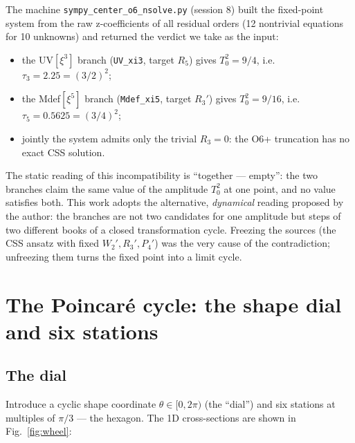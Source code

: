 \documentclass[11pt,a4paper]{article}
\newcommand{\tauu}{\tau_{3}}
\newcommand{\tauf}{\tau_{5}}
\begin{document}
The machine \texttt{sympy\_center\_o6\_nsolve.py} (session 8) built the
fixed-point system from the raw z-coefficients of all residual orders
(12 nontrivial equations for 10 unknowns) and returned the verdict we take
as the input:
\begin{itemize}
\item the UV$[\xi^3]$ branch (\texttt{UV\_xi3}, target $R_5$) gives
  $T_0^2 = 9/4$, i.e. $\tauu = 2.25 = (3/2)^2$;
\item the Mdef$[\xi^5]$ branch (\texttt{Mdef\_xi5}, target $R_3'$) gives
  $T_0^2 = 9/16$, i.e. $\tauf = 0.5625 = (3/4)^2$;
\item jointly the system admits only the trivial $R_3 = 0$: the O6+
  truncation has no exact CSS solution.
\end{itemize}
The static reading of this incompatibility is ``together --- empty'': the two
branches claim the same value of the amplitude $T_0^2$ at one point, and no
value satisfies both. This work adopts the alternative, \emph{dynamical}
reading proposed by the author: the branches are not two candidates for one
amplitude but steps of two different books of a closed transformation cycle.
Freezing the sources (the CSS ansatz with fixed $W_2', R_3', P_4'$) was the
very cause of the contradiction; unfreezing them turns the fixed point into
a limit cycle.

\section{The Poincar\'e cycle: the shape dial and six stations}

\subsection{The dial}

Introduce a cyclic shape coordinate $\theta \in [0, 2\pi)$ (the ``dial'') and
six stations at multiples of $\pi/3$ --- the hexagon. The 1D cross-sections
are shown in Fig.~\ref{fig:wheel}:
\end{document}
